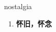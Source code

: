 
\begin{frame}
{\huge nostalgia}
\begin{center}
\begin{enumerate}\Large
  \item \textbf{怀旧，怀念}
\end{enumerate}
\end{center}
\end{frame}
